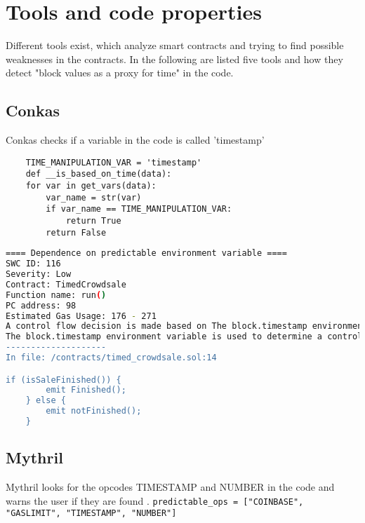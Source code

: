 \section{Tools and code properties}
Different tools exist, which analyze smart contracts and trying to find possible weaknesses in the contracts. \newline
In the following are listed five tools and how they detect "block values as a proxy for time" in the code.

\subsection{Conkas}
Conkas checks if a variable in the code is called 'timestamp' \cite{conkas_opcodes}
\begin{lstlisting}
    TIME_MANIPULATION_VAR = 'timestamp'
    def __is_based_on_time(data):
    for var in get_vars(data):
        var_name = str(var)
        if var_name == TIME_MANIPULATION_VAR:
            return True
        return False
\end{lstlisting}

\begin{lstlisting}[language=bash, caption="conkas output for the timed\_crowdsale.sol contract"]
==== Dependence on predictable environment variable ====
SWC ID: 116
Severity: Low
Contract: TimedCrowdsale
Function name: run()
PC address: 98
Estimated Gas Usage: 176 - 271
A control flow decision is made based on The block.timestamp environment variable.
The block.timestamp environment variable is used to determine a control flow decision. Note that the values of variables like coinbase, gaslimit, block number and timestamp are predictable and can be manipulated by a malicious miner. Also keep in mind that attackers know hashes of earlier blocks. Don't use any of those environment variables as sources of randomness and be aware that use of these variables introduces a certain level of trust into miners.
--------------------
In file: /contracts/timed_crowdsale.sol:14

if (isSaleFinished()) {
        emit Finished();
    } else {
        emit notFinished();
    }
\end{lstlisting}

\subsection{Mythril}
Mythril looks for the opcodes TIMESTAMP and NUMBER in the code and warns the user if they are found \cite{mythril_opcodes}. \newline
\verb|predictable_ops = ["COINBASE", "GASLIMIT", "TIMESTAMP", "NUMBER"]|

